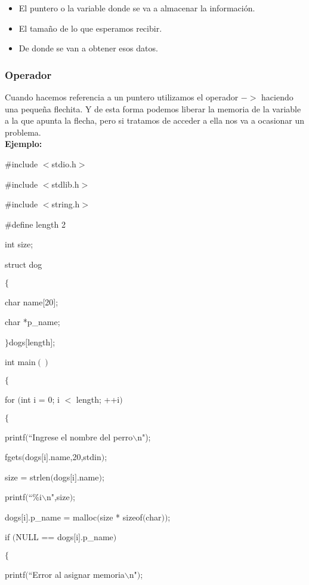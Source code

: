\documentclass[]{article}
\begin{document}
	\begin{itemize}
		\item El puntero o la variable donde se va a almacenar la información.
		\item El tamaño de lo que esperamos recibir.
		\item De donde se van a obtener esos datos.
	\end{itemize}
	
	
	
	\subsubsection{Operador}
	
	Cuando hacemos referencia a un puntero utilizamos el operador $->$ haciendo una pequeña flechita. Y de esta forma podemos liberar la memoria de la variable a la que apunta la flecha, pero si tratamos de acceder a ella nos va a ocasionar un problema.\\
	
	\textbf{Ejemplo:\\}
	
	\#include $<$stdio.h$>$
	
	\#include $<$stdlib.h$>$
	
	\#include $<$string.h$>$
	
	\#define length 2
	
	int size;
	
	struct dog
	
	$\lbrace$
	
	char name$[$20$]$;
	
	char *p\_name;
	
	$\rbrace$dogs$[$length$]$;
	
	int main$()$
	
	$\lbrace$
	
	for $($int i = 0; i $<$ length; ++i$)$
	
	$\lbrace$
	
	printf$($``Ingrese el nombre del perro$\backslash$n");
	
	fgets$($dogs$[$i$]$.name,20,stdin$)$;
	
	size = strlen$($dogs$[$i$]$.name$)$;
	
	printf$($``\%i$\backslash$n",size$)$;
	
	dogs$[$i$]$.p\_name = malloc$($size * sizeof$($char$))$;
	
	if $($NULL == dogs$[$i$]$.p\_name$)$
	
	$\lbrace$
	
	printf$($``Error al asignar memoria$\backslash$n"$)$;
	
\end{document}
